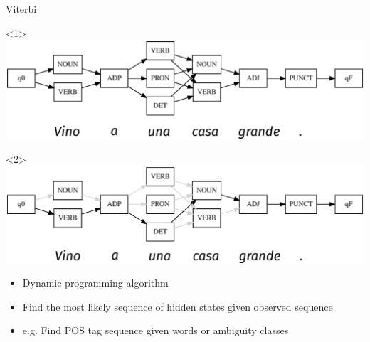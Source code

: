 \documentclass{beamer}
\begin{document}

\begin{frame}{Viterbi}

\begin{onlyenv}<1>
\includegraphics[width=\textwidth]{images/viterbi-1.eps}
\end{onlyenv}

\begin{onlyenv}<2>
\includegraphics[width=\textwidth]{images/viterbi-2.eps}
\end{onlyenv}

\begin{itemize}
  \item Dynamic programming algorithm
  \item Find the most likely sequence of hidden states given 
    observed sequence
  \item e.g. Find POS tag sequence given words or ambiguity classes
\end{itemize}

\end{frame}
\end{document}
